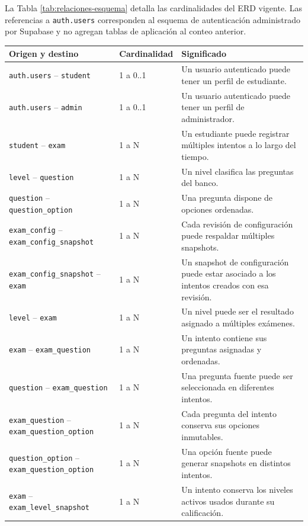 La Tabla \ref{tab:relaciones-esquema} detalla las cardinalidades del ERD vigente. Las referencias a \texttt{auth.users} corresponden al esquema de autenticación administrado por Supabase y no agregan tablas de aplicación al conteo anterior.

\begin{longtable}{p{4cm} p{2.5cm} p{7cm}}
\toprule
\textbf{Origen y destino} & \textbf{Cardinalidad} & \textbf{Significado} \\
\midrule
\endhead
\texttt{auth.users} -- \texttt{student} & 1 a 0..1 & Un usuario autenticado puede tener un perfil de estudiante. \\
\texttt{auth.users} -- \texttt{admin} & 1 a 0..1 & Un usuario autenticado puede tener un perfil de administrador. \\
\texttt{student} -- \texttt{exam} & 1 a N & Un estudiante puede registrar múltiples intentos a lo largo del tiempo. \\
\texttt{level} -- \texttt{question} & 1 a N & Un nivel clasifica las preguntas del banco. \\
\texttt{question} -- \texttt{question\_option} & 1 a N & Una pregunta dispone de opciones ordenadas. \\
\texttt{exam\_config} -- \texttt{exam\_config\_snapshot} & 1 a N & Cada revisión de configuración puede respaldar múltiples snapshots. \\
\texttt{exam\_config\_snapshot} -- \texttt{exam} & 1 a N & Un snapshot de configuración puede estar asociado a los intentos creados con esa revisión. \\
\texttt{level} -- \texttt{exam} & 1 a N & Un nivel puede ser el resultado asignado a múltiples exámenes. \\
\texttt{exam} -- \texttt{exam\_question} & 1 a N & Un intento contiene sus preguntas asignadas y ordenadas. \\
\texttt{question} -- \texttt{exam\_question} & 1 a N & Una pregunta fuente puede ser seleccionada en diferentes intentos. \\
\texttt{exam\_question} -- \texttt{exam\_question\_option} & 1 a N & Cada pregunta del intento conserva sus opciones inmutables. \\
\texttt{question\_option} -- \texttt{exam\_question\_option} & 1 a N & Una opción fuente puede generar snapshots en distintos intentos. \\
\texttt{exam} -- \texttt{exam\_level\_snapshot} & 1 a N & Un intento conserva los niveles activos usados durante su calificación. \\

\end{longtable}
